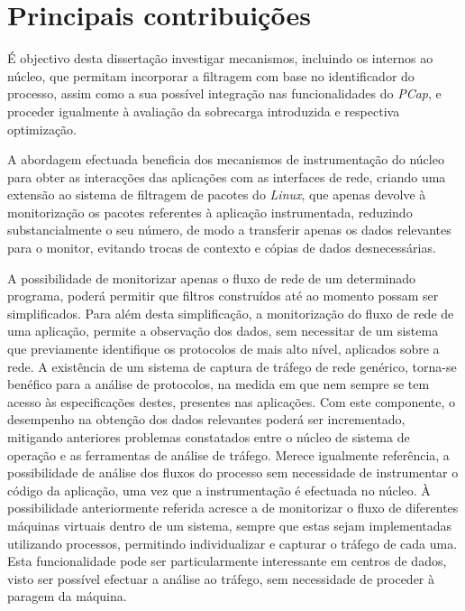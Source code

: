 \section{Principais contribuições} 
\label{sec:intro_contribuicoes}

É objectivo desta dissertação investigar mecanismos, incluindo os internos ao núcleo, que permitam incorporar a filtragem com base no identificador do processo, assim como a sua possível integração nas funcionalidades do \textit{PCap}, e proceder igualmente à avaliação da sobrecarga introduzida e respectiva optimização.

A abordagem efectuada beneficia dos mecanismos de instrumentação do núcleo para obter as interacções das aplicações com as interfaces de rede, criando uma extensão ao sistema de filtragem de pacotes do \textit{Linux}, que apenas devolve à monitorização os pacotes referentes à aplicação instrumentada, reduzindo substancialmente o seu número, de modo a transferir apenas os dados relevantes para o monitor, evitando trocas de contexto e cópias de dados desnecessárias.

A possibilidade de monitorizar apenas o fluxo de rede de um determinado programa, poderá permitir que filtros construídos até ao momento possam ser simplificados.
Para além desta simplificação, a monitorização do fluxo de rede de uma aplicação, permite a observação dos dados, sem necessitar de um sistema que previamente identifique os protocolos de mais alto nível, aplicados sobre a rede.
A existência de um sistema de captura de tráfego de rede genérico, torna-se benéfico para a análise de protocolos, na medida em que nem sempre se tem acesso às especificações destes, presentes nas aplicações.
Com este componente, o desempenho na obtenção dos dados relevantes poderá ser incrementado, mitigando anteriores problemas constatados entre o núcleo de sistema de operação e as ferramentas de análise de tráfego.
Merece igualmente referência, a possibilidade de análise dos fluxos do processo sem necessidade de instrumentar o código da aplicação, uma vez que a instrumentação é efectuada no núcleo.
À possibilidade anteriormente referida acresce a de monitorizar o fluxo de diferentes máquinas virtuais dentro de um sistema, sempre que estas sejam implementadas utilizando processos, permitindo individualizar e capturar o tráfego de cada uma.
Esta funcionalidade pode ser particularmente interessante em centros de dados, visto ser possível efectuar a análise ao tráfego, sem necessidade de proceder à paragem da máquina.

